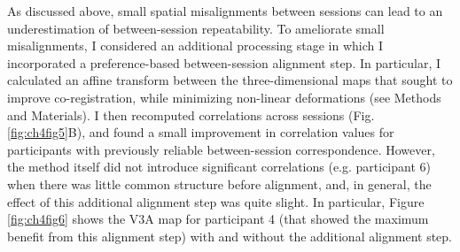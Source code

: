 As discussed above, small spatial misalignments between sessions can lead to an underestimation of between-session repeatability. To ameliorate small misalignments, I considered an additional processing stage in which I incorporated a preference-based between-session alignment step. In particular, I calculated an affine transform between the three-dimensional maps that sought to improve co-registration, while minimizing non-linear deformations (see Methods and Materials). I then recomputed correlations across sessions (Fig. \ref{fig:ch4fig5}B), and found a small improvement in correlation values for participants with previously reliable between-session correspondence. However, the method itself did not introduce significant correlations (e.g. participant 6) when there was little common structure before alignment, and, in general, the effect of this additional alignment step was quite slight. In particular, Figure \ref{fig:ch4fig6} shows the V3A map for participant 4 (that showed the maximum benefit from this alignment step) with and without the additional alignment step. 

